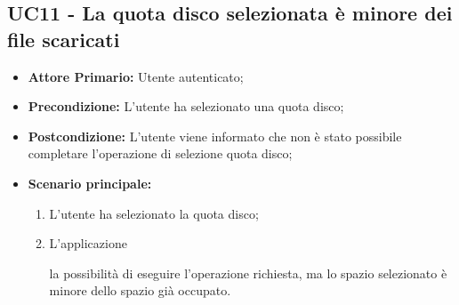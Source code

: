 \subsection{UC11 - La quota disco selezionata è minore dei file scaricati}
\label{UC11}
\begin{itemize}
\item \textbf{Attore Primario:} Utente autenticato;
\item \textbf{Precondizione:} L'utente ha selezionato una quota disco;
\item \textbf{Postcondizione:} L'utente viene informato che non è stato possibile completare l'operazione di selezione quota disco;
\item \textbf{Scenario principale:}
    \begin{enumerate}
    \item L'utente ha selezionato la quota disco;
    \item L'applicazione  la possibilità di eseguire l'operazione richiesta, ma lo spazio selezionato è minore dello spazio già occupato.
    \end{enumerate}
\end{itemize}